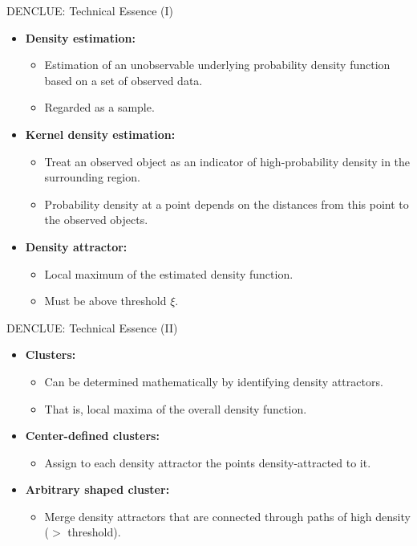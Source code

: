 \begin{frame}{DENCLUE: Technical Essence (I)}
	\begin{itemize}
		\item \textbf{Density estimation:}
		      \begin{itemize}
			      \item Estimation of an unobservable underlying probability density
			            function based on a set of observed data.
			      \item Regarded as a sample.
		      \end{itemize}
		\item \textbf{Kernel density estimation:}
		      \begin{itemize}
			      \item Treat an observed object as an indicator of high-probability
			            density in the surrounding region.
			      \item Probability density at a point depends on the distances from
			            this point to the observed objects.
		      \end{itemize}
		\item \textbf{Density attractor:}
		      \begin{itemize}
			      \item Local maximum of the estimated density function.
			      \item Must be above threshold $\xi$.
		      \end{itemize}
	\end{itemize}
\end{frame}

\begin{frame}{DENCLUE: Technical Essence (II)}
	\begin{itemize}
		\item \textbf{Clusters:}
		      \begin{itemize}
			      \item Can be determined mathematically by identifying density
			            attractors.
			      \item That is, local maxima of the overall density function.
		      \end{itemize}
		\item \textbf{Center-defined clusters:}
		      \begin{itemize}
			      \item Assign to each density attractor the points density-attracted
			            to it.
		      \end{itemize}
		\item \textbf{Arbitrary shaped cluster:}
		      \begin{itemize}
			      \item Merge density attractors that are connected through paths of
			            high density ($>$ threshold).
		      \end{itemize}
	\end{itemize}
\end{frame}
